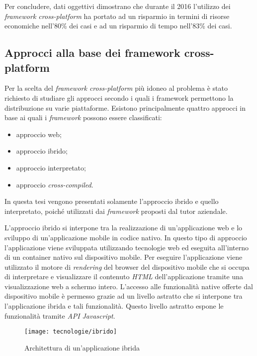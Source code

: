 Per concludere, dati oggettivi dimostrano che durante il 2016 l'utilizzo dei \textit{framework cross-platform} ha portato ad un risparmio in termini di risorse economiche nell'80\% dei casi e ad un risparmio di tempo nell'83\% dei casi.

\subsection{Approcci alla base dei framework cross-platform}

Per la scelta del \textit{framework cross-platform} più idoneo al problema è stato richiesto di studiare gli approcci secondo i quali i framework permettono la distribuzione su varie piattaforme. Esistono principalmente quattro approcci in base ai quali i \textit{framework} possono essere classificati:
\begin{itemize}
	\item approccio web;
	\item approccio ibrido;
	\item approccio interpretato;
	\item approccio \textit{cross-compiled}.
\end{itemize}

In questa tesi vengono presentati solamente l'approccio ibrido e quello interpretato, poiché utilizzati dai \textit{framework} proposti dal tutor aziendale.

L'approccio ibrido si interpone tra la realizzazione di un'applicazione web e lo sviluppo di un'applicazione mobile in codice nativo. In questo tipo di approccio l'applicazione viene sviluppata utilizzando tecnologie web ed eseguita all'interno di un container nativo sul dispositivo mobile. Per eseguire l'applicazione viene utilizzato il motore di \textit{rendering} del browser del dispositivo mobile che si occupa di interpretare e visualizzare il contenuto \textit{HTML} dell'applicazione tramite una visualizzazione web a schermo intero. L'accesso alle funzionalità native offerte dal dispositivo mobile è permesso grazie ad un livello astratto che si interpone tra l'applicazione ibrida e tali funzionalità. Questo livello astratto espone le funzionalità tramite \textit{API} \textit{Javascript}. 

\begin{figure}[!h] 
    \centering 
    \texttt{[image: tecnologie/ibrido]} 
    \caption{Architettura di un'applicazione ibrida}
\end{figure}

